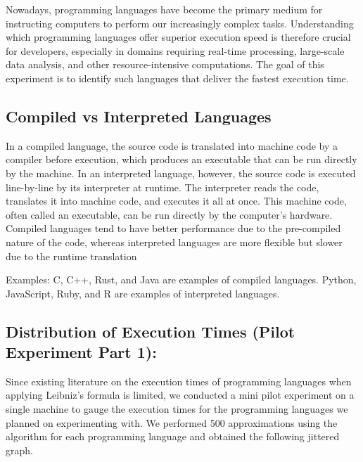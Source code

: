 \documentclass[12pt,halfline,a4paper,]{ouparticle}
\begin{document}
Nowadays, programming languages have become the primary medium for
instructing computers to perform our increasingly complex tasks.
Understanding which programming languages offer superior execution speed
is therefore crucial for developers, especially in domains requiring
real-time processing, large-scale data analysis, and other
resource-intensive computations. The goal of this experiment is to
identify such languages that deliver the fastest execution time.

\hypertarget{compiled-vs-interpreted-languages}{%
\subsection{Compiled vs Interpreted
Languages}\label{compiled-vs-interpreted-languages}}

In a compiled language, the source code is translated into machine code
by a compiler before execution, which produces an executable that can be
run directly by the machine. In an interpreted language, however, the
source code is executed line-by-line by its interpreter at runtime. The
interpreter reads the code, translates it into machine code, and
executes it all at once. This machine code, often called an executable,
can be run directly by the computer's hardware. Compiled languages tend
to have better performance due to the pre-compiled nature of the code,
whereas interpreted languages are more flexible but slower due to the
runtime translation

Examples: C, C++, Rust, and Java are examples of compiled languages.
Python, JavaScript, Ruby, and R are examples of interpreted languages.
\newpage

\hypertarget{distribution-of-execution-times-pilot-experiment-part-1}{%
\subsection{Distribution of Execution Times (Pilot Experiment Part
1):}\label{distribution-of-execution-times-pilot-experiment-part-1}}

Since existing literature on the execution times of programming
languages when applying Leibniz's formula is limited, we conducted a
mini pilot experiment on a single machine to gauge the execution times
for the programming languages we planned on experimenting with. We
performed 500 approximations using the algorithm for each programming
language and obtained the following jittered graph.
\end{document}
